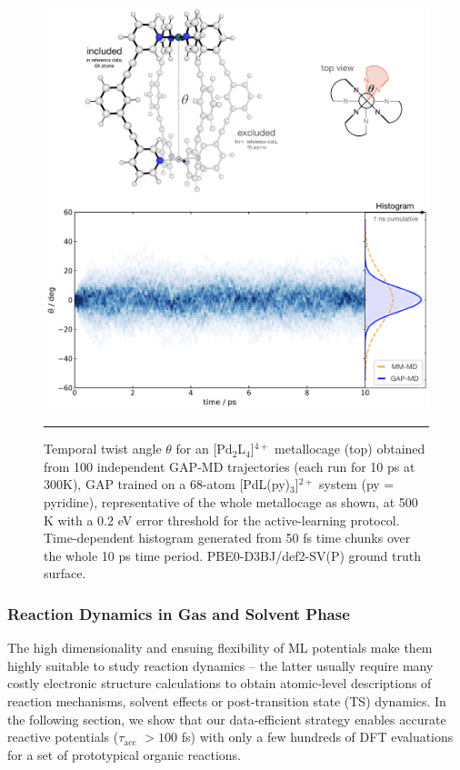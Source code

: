 \documentclass[../../main.tex]{subfiles}
\newcommand{\taua}{$\tau_\text{acc}$ }
\begin{document}
\begin{figure}[h!]
	\vspace{0.4cm}
	\centering
	\includegraphics[width=14cm]{6/gap/figs_ms/fig4}
	\vspace{0.2cm}
	\hrule
	\caption{Temporal twist angle $\theta$ for an [Pd${}_2$L${}_4$]$^{4+}$ metallocage (top) obtained from 100 independent GAP-MD trajectories (each run for 10 ps at 300K), GAP trained on a 68-atom [PdL(py)${}_3$]$^{2+}$ system (py = pyridine), representative of the whole metallocage as shown, at 500 K with a 0.2 eV error threshold for the active-learning protocol. Time-dependent histogram generated from 50 fs time chunks over the whole 10 ps time period. PBE0-D3BJ/def2-SV(P) ground truth surface.}
	\label{fig::ml_4}
\end{figure}


\subsubsection{Reaction Dynamics in Gas and Solvent Phase}

The high dimensionality and ensuing flexibility of ML potentials make them highly suitable to study reaction dynamics – the latter usually require many costly electronic structure calculations to obtain atomic-level descriptions of reaction mechanisms, solvent effects or post-transition state (TS) dynamics.\cite{Pratihar2017, Ess2008} In the following section, we show that our data-efficient strategy enables accurate reactive potentials (\taua $> 100$ fs) with only a few hundreds of DFT evaluations for a set of prototypical organic reactions.
\end{document}
